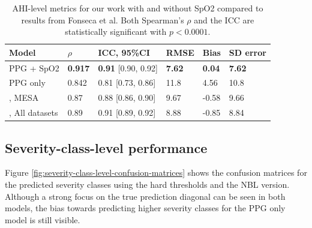 \renewcommand{\arraystretch}{1.5}
\begin{table}
    \centering
    \begin{tabular}{ l p{1cm} p{2.5cm} p{1cm} p{1cm} p{1.5cm} }
        Model & $\rho$ & ICC, 95\%CI & RMSE & Bias & SD error \\
        \hline
        PPG + SpO2 & \textbf{0.917} & \textbf{0.91} [0.90, 0.92] & \textbf{7.62} & \textbf{0.04} & \textbf{7.62} \\
        PPG only   & 0.842 & 0.81 [0.73, 0.86] & 11.8 & 4.56 & 10.8 \\
        \hline
        \cite{fonseca2024estimating}, MESA & 0.87 & 0.88 [0.86, 0.90] & 9.67 & -0.58 & 9.66 \\
        \cite{fonseca2024estimating}, All datasets & 0.89 & 0.91 [0.89, 0.92] & 8.88 & -0.85 & 8.84 \\
    \end{tabular}
    \caption{AHI-level metrics for our work with and without SpO2 compared to results from Fonseca et al. Both Spearman's $\rho$ and the ICC are statistically significant with $p < 0.0001$. \label{tab:ahi-level-metrics}}
\end{table}

\subsection*{Severity-class-level performance}

Figure \ref{fig:severity-class-level-confusion-matrices} shows the confusion matrices for the predicted severity classes using the hard thresholds and the NBL version. Although a strong focus on the true prediction diagonal can be seen in both models, the bias towards predicting higher severity classes for the PPG only model is still visible.

